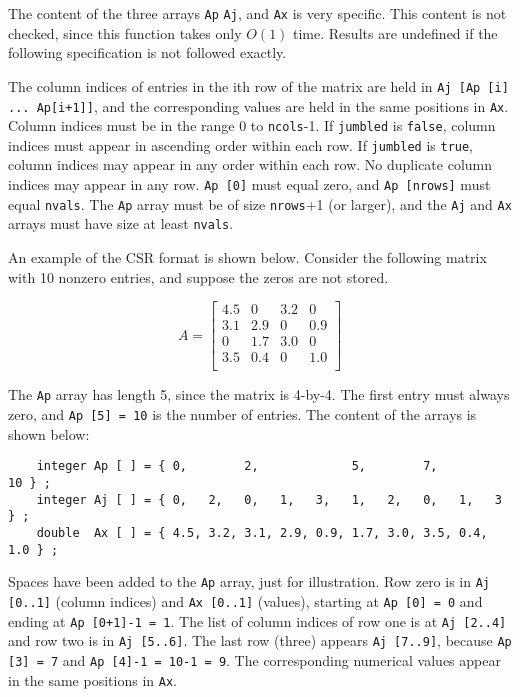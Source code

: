 The content of the three arrays \verb'Ap' \verb'Aj', and \verb'Ax' is very
specific.  This content is not checked, since this function takes only
$O(1)$ time.  Results are undefined if the following specification is not
followed exactly.

The column indices of entries in the ith row of the matrix are held in
\verb'Aj [Ap [i] ... Ap[i+1]]', and the corresponding values are held in the
same positions in \verb'Ax'.  Column indices must be in the range 0 to
\verb'ncols'-1.  If \verb'jumbled' is \verb'false', column indices must appear
in ascending order within each row.  If \verb'jumbled' is \verb'true', column
indices may appear in any order within each row.  No duplicate column indices
may appear in any row.  \verb'Ap [0]' must equal zero, and \verb'Ap [nrows]'
must equal \verb'nvals'.  The \verb'Ap' array must be of size \verb'nrows'+1
(or larger), and the \verb'Aj' and \verb'Ax' arrays must have size at least
\verb'nvals'.

An example of the CSR format is shown below.  Consider the following
matrix with 10 nonzero entries, and suppose the zeros are not stored.

    \begin{equation}
    \label{eqn:Aexample}
    A = \left[
    \begin{array}{cccc}
    4.5 &   0 & 3.2 &   0 \\
    3.1 & 2.9 &  0  & 0.9 \\
     0  & 1.7 & 3.0 &   0 \\
    3.5 & 0.4 &  0  & 1.0 \\
    \end{array}
    \right]
    \end{equation}

The \verb'Ap' array has length 5, since the matrix is 4-by-4.  The first entry
must always zero, and \verb'Ap [5] = 10' is the number of entries.
The content of the arrays is shown below:

{\footnotesize
\begin{verbatim}
    integer Ap [ ] = { 0,        2,             5,        7,            10 } ;
    integer Aj [ ] = { 0,   2,   0,   1,   3,   1,   2,   0,   1,   3   } ;
    double  Ax [ ] = { 4.5, 3.2, 3.1, 2.9, 0.9, 1.7, 3.0, 3.5, 0.4, 1.0 } ; \end{verbatim} }

Spaces have been added to the \verb'Ap' array, just for illustration.  Row zero
is in \verb'Aj [0..1]' (column indices) and \verb'Ax [0..1]' (values), starting
at \verb'Ap [0] = 0' and ending at \verb'Ap [0+1]-1 = 1'.  The list of column
indices of row one is at \verb'Aj [2..4]' and row two is in \verb'Aj [5..6]'.
The last row (three) appears \verb'Aj [7..9]', because \verb'Ap [3] = 7' and
\verb'Ap [4]-1 = 10-1 = 9'.  The corresponding numerical values appear in the
same positions in \verb'Ax'.

